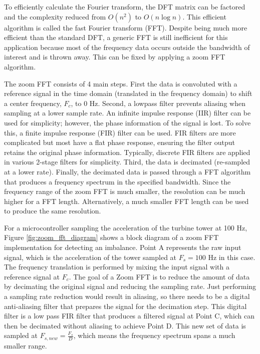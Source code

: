 To efficiently calculate the Fourier transform, the DFT matrix can be factored and the complexity reduced from $O(n^2)$ to $O(n \log{n})$.  This efficient algorithm is called the fast Fourier transform (FFT).  Despite being much more efficient than the standard DFT, a generic FFT is still inefficient for this application because most of the frequency data occurs outside the bandwidth of interest and is thrown away.  This can be fixed by applying a zoom FFT algorithm.

The zoom FFT consists of 4 main steps.  First the data is convoluted with a reference signal in the time domain (translated in the frequency domain) to shift a center frequency, $F_c$, to 0 Hz.  Second, a lowpass filter prevents aliasing when sampling at a lower sample rate.  An infinite impulse response (IIR) filter can be used for simplicity; however, the phase information of the signal is lost.  To solve this, a finite impulse response (FIR) filter can be used.  FIR filters are more complicated but most have a flat phase response, ensuring the filter output retains the original phase information.  Typically, discrete FIR filters are applied in various 2-stage filters for simplicity.  Third, the data is decimated (re-sampled at a lower rate). Finally, the decimated data is passed through a FFT algorithm that produces a frequency spectrum in the specified bandwidth.  Since the frequency range of the zoom FFT is much smaller, the resolution can be much higher for a FFT length.  Alternatively, a much smaller FFT length can be used to produce the same resolution.

For a microcontroller sampling the acceleration of the turbine tower at 100 Hz, Figure \ref{fig:zoom_fft_diagram} shows a block diagram of a zoom FFT implementation for detecting an imbalance.  Point A represents the raw input signal, which is the acceleration of the tower sampled at $F_s=100$ Hz in this case.  The frequency translation is performed by mixing the input signal with a reference signal at $F_c$.  The goal of a Zoom FFT is to reduce the amount of data by decimating the original signal and reducing the sampling rate.  Just performing a sampling rate reduction would result in aliasing, so there needs to be a digital anti-aliasing filter that prepares the signal for the decimation step.  This digital filter is a low pass FIR filter that produces a filtered signal at Point C, which can then be decimated without aliasing to achieve Point D.  This new set of data is sampled at $F_{s,new}=\frac{F_s}{D}$, which means the frequency spectrum spans a much smaller range.

